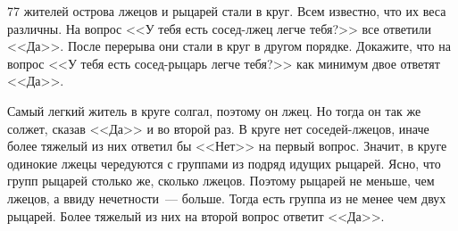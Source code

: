 77 жителей острова лжецов и рыцарей стали в круг.
Всем известно, что их веса различны.
На вопрос <<У тебя есть сосед-лжец легче тебя?>> все ответили <<Да>>.
После перерыва они стали в круг в другом порядке.
Докажите, что на вопрос <<У тебя есть сосед-рыцарь легче тебя?>> как минимум
двое ответят <<Да>>.

\solution
Самый легкий житель в круге солгал, поэтому он лжец.
Но тогда он так же солжет, сказав <<Да>> и во второй раз.
В круге нет соседей-лжецов, иначе более тяжелый из них ответил бы <<Нет>> на
первый вопрос.
Значит, в круге одинокие лжецы чередуются с группами из подряд идущих рыцарей.
Ясно, что групп рыцарей столько же, сколько лжецов.
Поэтому рыцарей не меньше, чем лжецов, а ввиду нечетности~--- больше.
Тогда есть группа из не менее чем двух рыцарей.
Более тяжелый из них на второй вопрос ответит <<Да>>.

